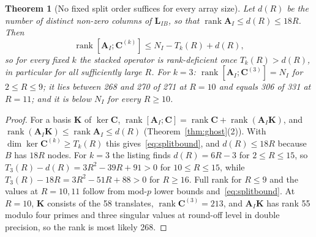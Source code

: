 \documentclass[11pt,a4paper]{article}
\newtheorem{theorem}{Theorem}[section]
\theoremstyle{definition}
\theoremstyle{remark}
\begin{document}
\begin{theorem}[No fixed split order suffices for every array size]\label{thm:splitscale}
Let $d(R)$ be the number of distinct non-zero columns of $\mathbf{L}_{IB}$, so that $\operatorname{rank}\mathbf{A}_I\le d(R)\le18R$. Then
\begin{equation}\label{eq:splitbound}
\operatorname{rank}[\mathbf{A}_I;\mathbf{C}^{(k)}]\le N_I-T_k(R)+d(R),
\end{equation}
so for every fixed $k$ the stacked operator is rank-deficient once $T_k(R)>d(R)$, in particular for all sufficiently large $R$. For $k = 3$: $\operatorname{rank}[\mathbf{A}_I;\mathbf{C}^{(3)}] = N_I$ for $2\le R\le9$; it lies between 268 and 270 of 271 at $R = 10$ and equals 306 of 331 at $R = 11$; and it is below $N_I$ for every $R\ge10$.
\end{theorem}
\begin{proof}
For a basis $\mathbf{K}$ of $\ker\mathbf{C}$, $\operatorname{rank}[\mathbf{A}_I;\mathbf{C}] = \operatorname{rank}\mathbf{C}+\operatorname{rank}(\mathbf{A}_I\mathbf{K})$, and $\operatorname{rank}(\mathbf{A}_I\mathbf{K})\le\operatorname{rank}\mathbf{A}_I\le d(R)$ (Theorem~\ref{thm:ghost}(2)). With $\dim\ker\mathbf{C}^{(k)}\ge T_k(R)$ this gives~\eqref{eq:splitbound}, and $d(R)\le18R$ because $B$ has $18R$ nodes. For $k = 3$ the listing finds $d(R) = 6R-3$ for $2\le R\le15$, so $T_3(R)-d(R) = 3R^2-39R+91>0$ for $10\le R\le15$, while $T_3(R)-18R = 3R^2-51R+88>0$ for $R\ge16$. Full rank for $R\le9$ and the values at $R = 10, 11$ follow from mod-$p$ lower bounds and~\eqref{eq:splitbound}. At $R = 10$, $\mathbf{K}$ consists of the 58 translates, $\operatorname{rank}\mathbf{C}^{(3)} = 213$, and $\mathbf{A}_I\mathbf{K}$ has rank 55 modulo four primes and three singular values at round-off level in double precision, so the rank is most likely 268.
\end{proof}
\end{document}

